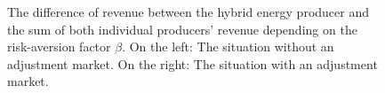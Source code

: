 \begin{figure}[h!]
	\centering
	
	\begin{minipage}{0.95\textwidth}
		\hfill
		
		\caption{The difference of revenue between the hybrid energy producer and the sum of both individual producers' revenue depending on the risk-aversion factor $\beta$. On the left: The situation without an adjustment market. On the right: The situation with an adjustment market.  }\label{fig:overyear}
	\end{minipage}	
\end{figure}

